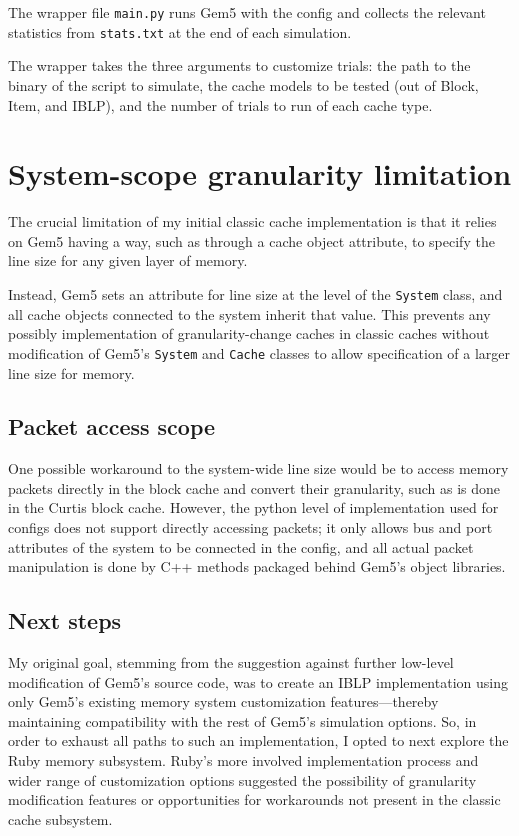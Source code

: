 \documentclass[12pt,twoside]{reedthesis}
\begin{document}
	The wrapper file \verb`main.py` runs Gem5 with the config and collects the relevant statistics from \verb`stats.txt` at the end of each simulation.

	The wrapper takes the three arguments to customize trials: the path to the binary of the script to simulate, the cache models to be tested (out of Block, Item, and IBLP), and the number of trials to run of each cache type.

\section{System-scope granularity limitation}

	The crucial limitation of my initial classic cache implementation is that it relies on Gem5 having a way, such as through a cache object attribute, to specify the line size for any given layer of memory.

	Instead, Gem5 sets an attribute for line size at the level of the \verb`System` class, and all cache objects connected to the system inherit that value. This prevents any possibly implementation of granularity-change caches in classic caches without modification of Gem5's \verb`System` and \verb`Cache` classes to allow specification of a larger line size for memory.

	\subsection*{Packet access scope}

	One possible workaround to the system-wide line size would be to access memory packets directly in the block cache and convert their granularity, such as is done in the Curtis block cache. However, the python level of implementation used for configs does not support directly accessing packets; it only allows bus and port attributes of the system to be connected in the config, and all actual packet manipulation is done by C++ methods packaged behind Gem5's object libraries.

	\subsection*{Next steps}

	My original goal, stemming from the suggestion against further low-level modification of Gem5's source code, was to create an IBLP implementation using only Gem5's existing memory system customization features---thereby maintaining compatibility with the rest of Gem5's simulation options. So, in order to exhaust all paths to such an implementation, I opted to next explore the Ruby memory subsystem. Ruby's more involved implementation process and wider range of customization options suggested the possibility of granularity modification features or opportunities for workarounds not present in the classic cache subsystem.
\end{document}
